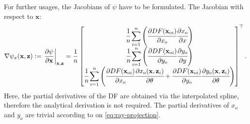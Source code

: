 For further usages, the Jacobians of $\psi$ have to be formulated.
The Jacobian with respect to $\mathbf{x}$:
\begin{equation}\label{eq:measmodel-jacobi-x}
    \nabla\psi_x(\mathbf{x},\mathbf{z}) := \left.\frac{\partial\psi}{\partial \mathbf{x}}\right\vert_{\mathbf{x},\mathbf{z}} =
    \frac{1}{n}
    \begin{bmatrix}
        \cfrac{1}{n}\displaystyle\sum\limits_{i=1}^{n}\left(\cfrac{\partial DF(\mathbf{x}_{\text{o}i})}{\partial x_{\text{o}}}\cfrac{\partial x_{\text{o}}}{\partial x}\right) \\
        \cfrac{1}{n}\displaystyle\sum\limits_{i=1}^{n}\left(\cfrac{\partial DF(\mathbf{x}_{\text{o}i})}{\partial y_{\text{o}}}\cfrac{\partial y_{\text{o}}}{\partial y}\right) \\
        \cfrac{1}{n}\displaystyle\sum\limits_{i=1}^{n}\left(\cfrac{\partial DF(\mathbf{x}_{\text{o}i})}{\partial x_{\text{o}}}\cfrac{\partial x_{\text{o}}(\mathbf{x},\mathbf{z}_i)}{\partial \theta}
        + \cfrac{\partial DF(\mathbf{x}_{\text{o}i})}{\partial y_{\text{o}}}\cfrac{\partial y_{\text{o}}(\mathbf{x},\mathbf{z}_i)}{\partial \theta}\right)                     \\
    \end{bmatrix}^{\top}.
\end{equation}
Here, the partial derivatives of the DF are obtained via the interpolated spline, therefore the analytical
derivation is not required.
The partial derivatives of $x_o$ and $y_o$ are trivial according to on \eqref{eq:ray-projection}.

